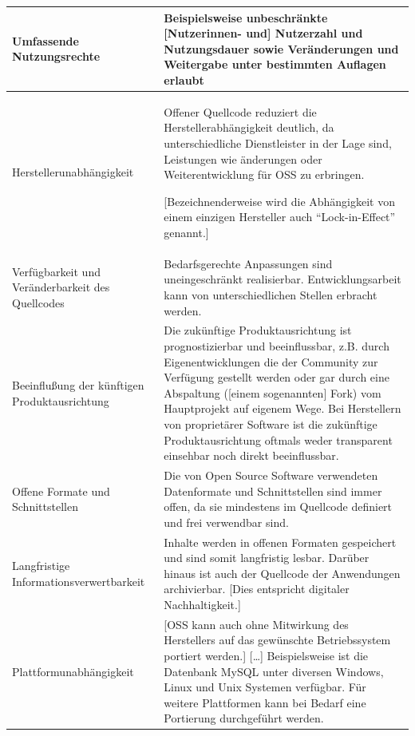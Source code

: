 \documentclass[a4paper]{scrartcl}
\begin{document}
\begin{supertabular}{|m{1.8900598in}m{4.77126in}|}
\hline

Umfassende Nutzungsrechte &

Beispielsweise unbeschränkte [Nutzerinnen- und]
Nutzerzahl und Nutzungsdauer sowie Veränderungen und Weitergabe unter bestimmten
Auflagen erlaubt \\

\hline

Herstellerunabhängigkeit &

Offener Quellcode reduziert die Herstellerabhängigkeit deutlich, da
unterschiedliche Dienstleister in der Lage sind, Leistungen wie änderungen oder
Weiterentwicklung für OSS zu erbringen.

[Bezeichnenderweise wird die Abhängigkeit von einem einzigen Hersteller auch
``Lock-in-Effect'' genannt.]\\

\hline

Verfügbarkeit und Veränderbarkeit des Quellcodes &

Bedarfsgerechte Anpassungen sind uneingeschränkt
realisierbar. Entwicklungsarbeit kann von unterschiedlichen Stellen erbracht
werden.\\

\hline 

Beeinflußung der künftigen Produktausrichtung &

Die zukünftige Produktausrichtung ist prognostizierbar und beeinflussbar,
z.B. durch Eigenentwicklungen die der Community zur Verfügung gestellt werden
oder gar durch eine Abspaltung ([einem sogenannten] Fork) vom Hauptprojekt auf
eigenem Wege. Bei Herstellern von proprietärer Software ist die zukünftige
Produktausrichtung oftmals weder transparent einsehbar noch direkt
beeinflussbar.\\

\hline

Offene Formate und Schnittstellen &

Die von Open Source Software verwendeten Datenformate und Schnittstellen sind
immer offen, da sie mindestens im Quellcode definiert und frei verwendbar
sind.\\

\hline

Langfristige Informationsverwertbarkeit &

Inhalte werden in offenen Formaten gespeichert und sind somit langfristig
lesbar. Darüber hinaus ist auch der Quellcode der Anwendungen
archivierbar. [Dies entspricht digitaler Nachhaltigkeit.]\\

\hline

Plattformunabhängigkeit &

[OSS kann auch ohne Mitwirkung des Herstellers auf das gewünschte Betriebssystem
portiert werden.]  [\ldots] Beispielsweise ist die Datenbank MySQL unter
diversen Windows, Linux und Unix Systemen verfügbar. Für weitere Plattformen
kann bei Bedarf eine Portierung durchgeführt werden.\\

\hline

\end{supertabular}
\end{document}
